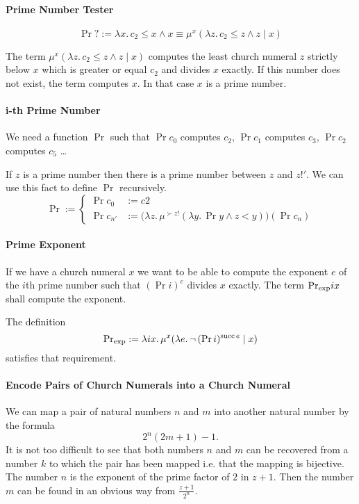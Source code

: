\paragraph{Prime Number Tester}
$$\Pr? :=
\lambda x.\, c_2 \le x \land
x \equiv \mu^x (\lambda z.\, c_2 \le z \land z\mid x)$$

The term $\mu^x (\lambda z.\, c_2 \le z \land z\mid x)$ computes the least
church numeral $z$ strictly below $x$ which is greater or equal $c_2$ and
divides $x$ exactly. If this number does not exist, the term computes $x$. In
that case $x$ is a prime number.



\paragraph{i-th Prime Number} We need a function $\Pr$ such that $\Pr c_0$
computes $c_2$, $\Pr c_1$ computes $c_3$, $\Pr c_2$ computes $c_5$ \ldots

If $z$ is a prime number then there is a prime number between $z$ and
$z!'$. We can use this fact to define $\Pr$ recursively.
$$
\Pr :=
\begin{cases}
  \Pr c_0    &:= c2 \\
  \Pr c_{n'} &:=
  \big(\lambda z.\,
  \mu^{\succ z!}(\lambda y.\, \Pr y \land z < y)\big)
  (\Pr c_n)
\end{cases}
$$



\paragraph{Prime Exponent} If we have a church numeral $x$ we want to be able
to compute the exponent $e$ of the $i$th prime number such that $(\Pr i)^e$
divides $x$ exactly. The term $\text{Pr}_{\text{exp}} i x$ shall compute the exponent.

The definition
$$ \text{Pr}_{\text{exp}} :=
 \lambda i x.\, \mu^x (\lambda e.\, \neg\,  (\Pr i)^{\text{succ}\, e} \mid x)
$$
satisfies that requirement.


\paragraph{Encode Pairs of Church Numerals into a Church Numeral}

We can map a pair of natural numbers $n$ and $m$ into another natural number
by the formula
$$ 2^n (2m+1) -1.$$
It is not too difficult to see that both numbers $n$ and $m$ can be recovered
from a number $k$ to which the pair has been mapped i.e. that the mapping is
bijective. The number $n$ is the exponent of the prime factor of $2$ in
$z+1$. Then the number $m$ can be found in an obvious way from
$\frac{z+1}{2^n}$.

